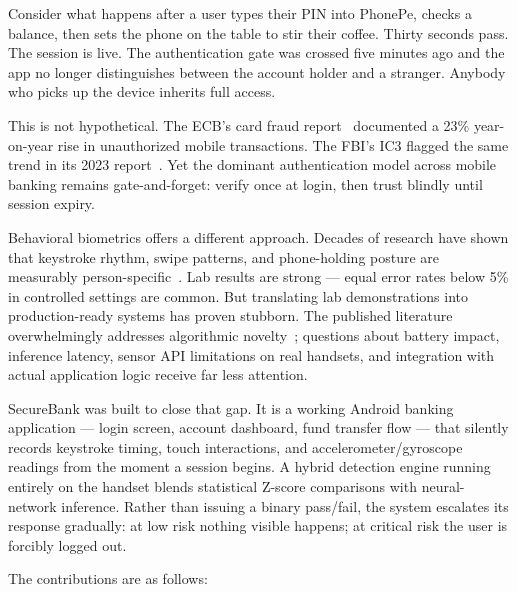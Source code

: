\documentclass[conference]{IEEEtran}
\begin{document}
Consider what happens after a user types their PIN into PhonePe, checks a balance, then sets the phone on the table to stir their coffee. Thirty seconds pass. The session is live. The authentication gate was crossed five minutes ago and the app no longer distinguishes between the account holder and a stranger. Anybody who picks up the device inherits full access.

This is not hypothetical. The ECB's card fraud report~\cite{ecb2022} documented a 23\% year-on-year rise in unauthorized mobile transactions. The FBI's IC3 flagged the same trend in its 2023 report~\cite{fbi2023}. Yet the dominant authentication model across mobile banking remains gate-and-forget: verify once at login, then trust blindly until session expiry.

Behavioral biometrics offers a different approach. Decades of research have shown that keystroke rhythm, swipe patterns, and phone-holding posture are measurably person-specific~\cite{teh2017keystroke,frank2013touchalytics,bo2013silentsense}. Lab results are strong --- equal error rates below 5\% in controlled settings are common. But translating lab demonstrations into production-ready systems has proven stubborn. The published literature overwhelmingly addresses algorithmic novelty~\cite{zheng2020survey}; questions about battery impact, inference latency, sensor API limitations on real handsets, and integration with actual application logic receive far less attention.

SecureBank was built to close that gap. It is a working Android banking application --- login screen, account dashboard, fund transfer flow --- that silently records keystroke timing, touch interactions, and accelerometer/gyroscope readings from the moment a session begins. A hybrid detection engine running entirely on the handset blends statistical Z-score comparisons with neural-network inference. Rather than issuing a binary pass/fail, the system escalates its response gradually: at low risk nothing visible happens; at critical risk the user is forcibly logged out.

The contributions are as follows:
\end{document}
